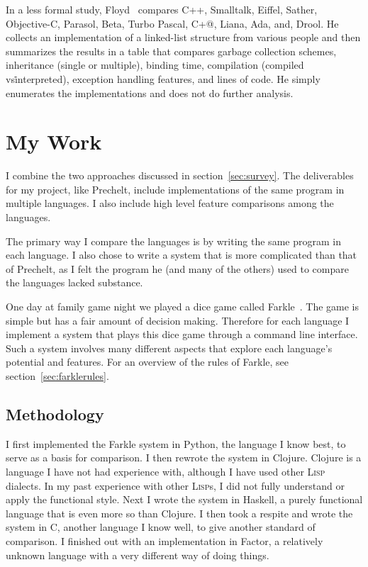 \documentclass{article}
\begin{document}
In a less formal study, Floyd~\cite{DDJFloydeCompOOLangs} compares C++,
Smalltalk, Eiffel, Sather, Objective-C, Parasol, Beta, Turbo Pascal, C+@,
Liana, Ada, and, Drool.  He collects an implementation of a linked-list
structure from various people and then summarizes the results in a table that
compares garbage collection schemes, inheritance (single or multiple), binding
time, compilation (compiled vs\. interpreted), exception handling features, and
lines of code.  He simply enumerates the implementations and does not do
further analysis.

\section{My Work}

I combine the two approaches discussed in section~\ref{sec:survey}.  The
deliverables for my project, like Prechelt, include implementations of the same
program in multiple languages. I also include high level feature comparisons
among the languages.

The primary way I compare the languages is by writing the same program in each
language.  I also chose to write a system that is more complicated than that of Prechelt,
as I felt the program he (and many of the others) used to compare the languages
lacked substance.

One day at family game night we played a dice game called
Farkle~\cite{farklewikipedia}.  The game is simple but has a fair amount of
decision making.  Therefore for each language I implement a system that plays
this dice game through a command line interface.  Such a system involves many
different aspects that explore each language's potential and features.  For an
overview of the rules of Farkle, see section~\ref{sec:farklerules}.

\subsection{Methodology}

I first implemented the Farkle system in Python, the language I know
best, to serve as a basis for comparison.  I then rewrote the system in Clojure.
Clojure is a language I have not had experience with, although I have used other
\textsc{Lisp} dialects.  In my past experience with other \textsc{Lisp}s, I did not
fully understand or apply the functional style.  Next I wrote the system in
Haskell, a purely functional language that is even more so than Clojure.  I
then took a respite and wrote the system in C, another language I know well, to
give another standard of comparison.  I finished out with an implementation in
Factor, a relatively unknown language with a very different way of doing things.
\end{document}
